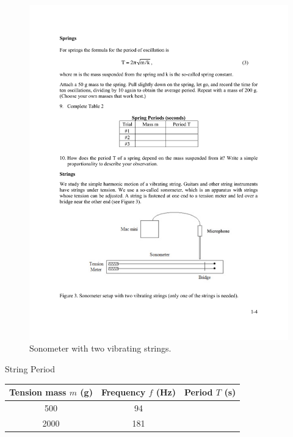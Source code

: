 \documentclass[11pt]{NSF}
\begin{document}
%
\begin{figure}[hbtp]
\begin{center}
\includegraphics[width=.75\textwidth]{fig1_3}
\caption{Sonometer with two vibrating strings.}
\label{f:3}
\end{center}
\end{figure}
%


%
\begin{table}[hbtp]
\begin{center}
String Period\\
\begin{tabular}{| c | c | c | }
\hline
Tension mass $m$ (g) & Frequency $f$ (Hz) & Period $T$ (s) \\
\hline
500 & 94 & \\
\hline
2000 & 181 & \\
\hline
\end{tabular}
\label{t:1}
\end{center}
\end{table}
%
\end{document}
